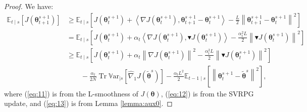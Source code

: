 \documentclass{article}
\theoremstyle{remark}
\theoremstyle{definition}
\DeclareMathOperator{\Tr}{Tr}
\newcommand{\norm}[2][\infty]{\left\|#2\right\|_{#1}}
\newcommand{\dotprod}[2]{\left\langle#1,#2\right\rangle}
\newcommand{\vtheta}{\boldsymbol{\theta}}
\newcommand{\gradJ}[1]{\nabla J(#1)}
\newcommand{\gradApp}[2]{\widehat{\nabla}_{#2}J(#1)}
\newcommand{\Ets}[2][t]{\mathbb{E}_{#1\mid s}\left[#2\right]}
\newcommand{\Varts}[2][t]{{\mathbb{V}\text{ar}}_{#1\mid s}\left[#2\right]}
\newcommand{\gradBlack}[1]{\blacktriangledown J(#1)}
\begin{document}
\begin{proof}
	We have:
	\begin{align}
	\Ets{J(\vtheta_{t+1}^{s+1})} 
	&\geq \Ets{J(\vtheta_t^{s+1})+\dotprod{\gradJ{\vtheta_t^{s+1}}}{\vtheta_{t+1}^{s+1}-\vtheta_t^{s+1}} - \frac{L}{2}\norm[]{\vtheta_{t+1}^{s+1}-\vtheta_t^{s+1}}^2} \label{eq:11}\\
	&= \Ets{J(\vtheta_t^{s+1})+\alpha_t\dotprod{\gradJ{\vtheta_t^{s+1}}}{\gradBlack{\vtheta_t^{s+1}}} - \frac{\alpha_t^2L}{2}\norm[]{\gradBlack{\vtheta_t^{s+1}}}^2} \label{eq:12}\\
	&\geq
	\Ets{J(\vtheta_t^{s+1})+\alpha_t\norm[]{\gradJ{\vtheta_t^{s+1}}}^2 - \frac{\alpha_t^2L}{2}\norm[]{\gradBlack{\vtheta_t^{s+1}}}^2} \nonumber\\
	&\qquad-
	\frac{\alpha_t}{2N}\Tr\Varts[]{\gradApp{\tilde{\vtheta}^s}{1}} -\frac{\alpha_tL^2}{2}\Ets[t-1]{\norm[]{\vtheta_t^{s+1} - \tilde{\vtheta}^s}^2}, \label{eq:13}
\end{align}
where (\ref{eq:11}) is from the L-smoothness of $J(\vtheta)$, (\ref{eq:12}) is from the SVRPG update, and (\ref{eq:13}) is from Lemma \ref{lemma:aux0}.


\end{proof}
\end{document}
